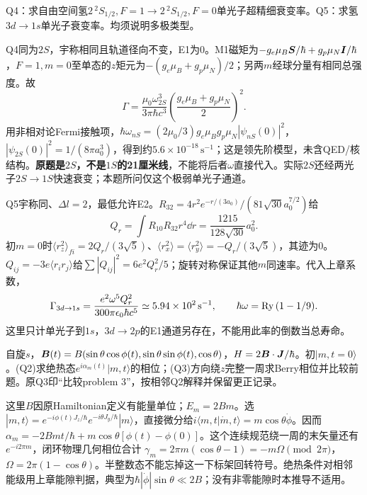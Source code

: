 \begin{exercise}
Q4：求自由空间氢$2\,{}^2S_{1/2},F=1\to2\,{}^2S_{1/2},F=0$单光子超精细衰变率。Q5：求氢$3d\to1s$单光子衰变率。均须说明多极类型。
\end{exercise}
\begin{solution}
Q4同为$2S$，宇称相同且轨道径向不变，E1为0。M1磁矩为$-g_e\mu_B\boldsymbol{S}/\hbar+g_p\mu_N\boldsymbol{I}/\hbar$，$F=1,m=0$至单态的$z$矩元为$-(g_e\mu_B+g_p\mu_N)/2$；另两$m$经球分量有相同总强度。故
\[
 \Gamma=\frac{\mu_0\omega_{2S}^3}{3\pi\hbar c^3}
 \left(\frac{g_e\mu_B+g_p\mu_N}{2}\right)^2.
\]
用非相对论Fermi接触项，$\hbar\omega_{nS}=(2\mu_0/3)g_e\mu_Bg_p\mu_N|\psi_{nS}(0)|^2$，$|\psi_{2S}(0)|^2=1/(8\pi a_0^3)$，得到约$5.6\times10^{-18}\,\mathrm{s}^{-1}$；这是领先阶模型，未含QED/核结构。\textbf{原题是$2S$，不是$1S$的21厘米线}，不能将后者$\omega$直接代入。实际$2S$还经两光子$2S\to1S$快速衰变；本题所问仅这个极弱单光子通道。

Q5宇称同、$\Delta l=2$，最低允许E2。$R_{32}=4r^2e^{-r/(3a_0)}/(81\sqrt{30}a_0^{7/2})$给
\[
 Q_r=\int R_{10}R_{32}r^4\dd r
 =\frac{1215}{128\sqrt{30}}a_0^2.
\]
初$m=0$时$\langle r_z^2\rangle_{fi}=2Q_r/(3\sqrt5)$、$\langle r_x^2\rangle=\langle r_y^2\rangle=-Q_r/(3\sqrt5)$，其迹为0。$Q_{ij}=-3e\langle r_ir_j\rangle$给$\sum|Q_{ij}|^2=6e^2Q_r^2/5$；旋转对称保证其他$m$同速率。代入上章系数，
\[
 \Gamma_{3d\to1s}=\frac{e^2\omega^5Q_r^2}{300\pi\epsilon_0\hbar c^5}
 \simeq5.94\times10^2\,\mathrm{s}^{-1},\qquad
 \hbar\omega={\rm Ry}\,(1-1/9).
\]
这里只计单光子到$1s$，$3d\to2p$的E1通道另存在，不能用此率的倒数当总寿命。
\end{solution}

\begin{exercise}
自旋$s$，$\boldsymbol{B}(t)=B(\sin\theta\cos\phi(t),\sin\theta\sin\phi(t),\cos\theta)$，$H=2\boldsymbol{B}\cdot\boldsymbol{J}/\hbar$。初$|m,t=0\rangle$。(Q2)求绝热态$e^{i\alpha_m(t)}|m,t\rangle$的相位；(Q3)方向绕$z$完整一周求Berry相位并比较前题。原Q3印“比较problem 3”，按相邻Q2解释并保留更正记录。
\end{exercise}
\begin{solution}
这里$B$因原Hamiltonian定义有能量单位；$E_m=2Bm$。选$|m,t\rangle=e^{-i\phi(t)J_z/\hbar}e^{-i\theta J_y/\hbar}|m\rangle$，直接微分给$i\langle m,t|\dot m,t\rangle=m\cos\theta\dot\phi$。因而$\alpha_m=-2Bmt/\hbar+m\cos\theta[\phi(t)-\phi(0)]$。这个连续规范绕一周的末矢量还有$e^{-i2\pi m}$，闭环物理几何相位合计
$\gamma_m=2\pi m(\cos\theta-1)=-m\Omega\pmod{2\pi}$，$\Omega=2\pi(1-\cos\theta)$。半整数态不能忘掉这一下标架回转符号。绝热条件对相邻能级用上章能隙判据，典型为$\hbar|\dot\phi|\sin\theta\ll2B$；没有非零能隙时本推导不适用。
\end{solution}


